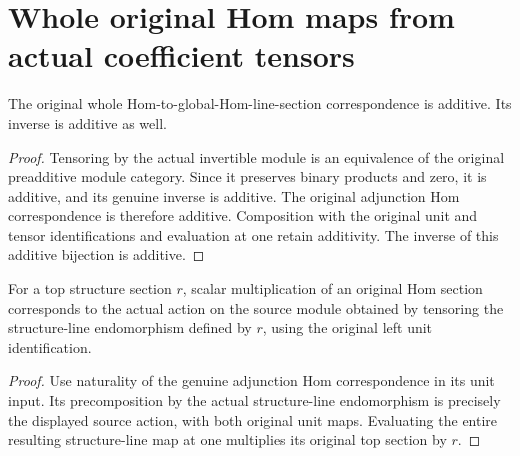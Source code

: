 \section{Whole original Hom maps from actual coefficient tensors}

\begin{lemma}\label{lem:kn-original-line-hom-section-additive}
\leanok
{}
The original whole Hom-to-global-Hom-line-section correspondence is additive.
Its inverse is additive as well.
\end{lemma}
\begin{proof}
Tensoring by the actual invertible module is an equivalence of the original
preadditive module category. Since it preserves binary products and zero,
it is additive, and its genuine inverse is additive. The original
adjunction Hom correspondence is therefore additive. Composition with the
original unit and tensor identifications and evaluation at one retain
additivity. The inverse of this additive bijection is additive.
\end{proof}

\begin{lemma}\label{lem:kn-original-line-hom-section-scalar}
\leanok
{}
For a top structure section $r$, scalar multiplication of an original Hom
section corresponds to the actual action on the source module obtained
by tensoring the structure-line endomorphism defined by $r$, using the
original left unit identification.
\end{lemma}
\begin{proof}
Use naturality of the genuine adjunction Hom correspondence in its unit
input. Its precomposition by the actual structure-line endomorphism is
precisely the displayed source action, with both original unit maps.
Evaluating the entire resulting structure-line map at one multiplies its
original top section by $r$.
\end{proof}

